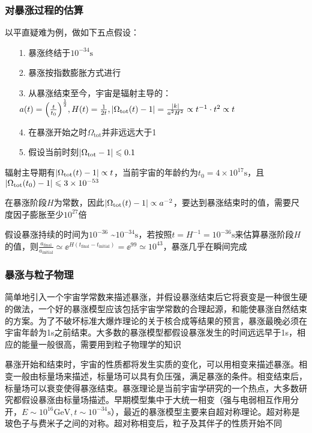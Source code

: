 \subsubsection{对暴涨过程的估算}
\par 
以平直疑难为例，做如下五点假设：
\begin{itemize}
	\item[1. ] 暴涨终结于$10^{-34} \mathrm{s}$
	\item[2. ] 暴涨按指数膨胀方式进行
	\item[3. ] 从暴涨结束至今，宇宙是辐射主导的：$a(t) = \qty(\frac{t}{t_0})^{\frac{1}{2}}, H(t) = \frac{1}{2t}, \abs{\Omega_{\text{tot}}(t) - 1} = \frac{\abs{k}}{a^2 H^2} \propto t^{-1} \cdot t^2 \propto t$
	\item[4. ] 在暴涨开始之时$\Omega_{\text{tot}}$并非远远大于1
	\item[5. ] 假设当前时刻$\abs{\Omega_{\text{tot}} - 1} \leqslant 0.1$
\end{itemize}
\par 
辐射主导期有$\abs{\Omega_{\text{tot}}(t) - 1} \propto t$，当前宇宙的年龄约为$t_0 = 4 \times 10^{17} \mathrm{s}$，且$\abs{\Omega_{\text{tot}}(t_0) - 1} \leqslant 3 \times 10^{-53}$
\par 
在暴涨阶段$H$为常数，因此$\abs{\Omega_{\text{tot}}(t) - 1} \propto a^{-2}$，要达到暴涨结束时的值，需要尺度因子膨胀至少$10^{27}$倍
\par 
假设暴涨持续的时间为$10^{-36}$ \textasciitilde $10^{-34} \mathrm{s}$，若按照$t = H^{-1} = 10^{-36} \mathrm{s}$来估算暴涨阶段$H$的值，则$\frac{a_{\text{final}}}{a_{\text{initial}}} \simeq \ee^{H(t_{\text{final}} - t_{\text{initial}})} = \ee^{99} \simeq 10^{43}$，暴涨几乎在瞬间完成


\subsubsection{暴涨与粒子物理}
\par 
简单地引入一个宇宙学常数来描述暴涨，并假设暴涨结束后它将衰变是一种很生硬的做法，一个好的暴涨模型应该包括宇宙学常数的合理起源，和能使暴涨自然结束的方案。为了不破坏标准大爆炸理论的关于核合成等结果的预言，暴涨最晚必须在宇宙年龄为1s之前结束。大多数的暴涨模型都假设暴涨发生的时间远远早于1s，相应的能量一般很高，需要用到粒子物理学的知识

\par 
暴涨开始和结束时，宇宙的性质都将发生实质的变化，可以用相变来描述暴涨。相变一般由标量场来描述，标量场可以具有负压强，满足暴涨的条件。相变结束后，标量场可以衰变使得暴涨结束。暴涨理论是当前宇宙学研究的一个热点，大多数研究都假设暴涨由标量场描述。早期模型集中于大统一相变（强与电弱相互作用分开，$E\sim 10^{16} \mathrm{GeV}, t\sim 10^{-34} \mathrm{s}$），最近的暴涨模型主要来自超对称理论。超对称是玻色子与费米子之间的对称。超对称相变后，粒子及其伴子的性质开始不同